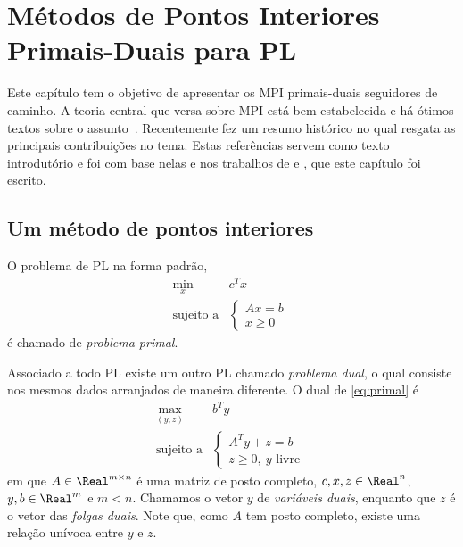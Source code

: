 

\chapter{Métodos de Pontos Interiores Primais-Duais  para \acl{PL}\label{chap:mpis}}


     

Este capítulo tem o objetivo de apresentar os \acl{MPI} primais-duais seguidores
de caminho. A teoria central que versa sobre \ac{MPI} está bem estabelecida e há
ótimos textos sobre o
assunto~\cite{Vanderbei:2008vp,Wright:Primal-dual-interior-point:1997h}.
Recentemente \textcite{Gondzio:2011ta} fez um resumo histórico no qual resgata as
principais contribuições no tema.  Estas referências servem como texto
introdutório e foi com base nelas e nos trabalhos de 
 \textcite{Colombo:2008wm} e \textcite{Villas-Boas:2000}, que este capítulo foi
 escrito.
    

     

   
   
\section{Um método de  pontos interiores}
O  problema de \ac{PL} na forma padrão, 
\begin{equation} %
	\begin{array}{lc}
\displaystyle \min_{x} & c^Tx \\
\text{sujeito a} &\begin{cases} Ax = b \\
				 x \geq 0	
				 \end{cases}\
\end{array}
\label{eq:primal}
\end{equation}
é chamado de \emph{problema primal}.

Associado a todo \ac{PL} existe um outro \ac{PL} chamado 
\emph{problema dual}, o qual consiste nos mesmos dados arranjados de maneira
diferente. O dual de \eqref{eq:primal} é
 \begin{equation}%
	\begin{array}{lc}
\displaystyle \max_{(y,z)} & b^Ty \\
\text{sujeito a} &\begin{cases} A^Ty + z = b \\
				 z \geq 0, \:y \text{ livre}	
				 \end{cases}\
\end{array}
\label{eq:dual}
\end{equation}
em que $A\in \Real^{m\times n}$ é uma matriz de posto completo, $c,x,z\in
\Real^n$, $y,b\in\Real^m$ e $m<n$. Chamamos o vetor $y$ de
\emph{variáveis duais}, enquanto que  $z$ é o vetor das \emph{folgas duais}.
Note que, como $A$ tem posto completo, existe uma relação unívoca entre
$y$ e $z$. 

